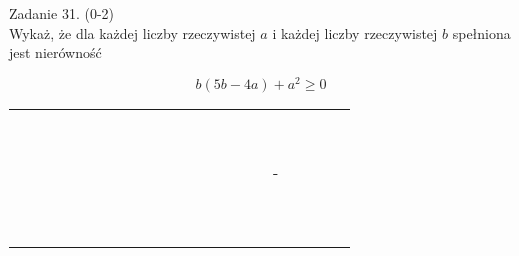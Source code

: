 \documentclass[10pt]{article}
\begin{document}
Zadanie 31. (0-2)\\
Wykaż, że dla każdej liczby rzeczywistej \(a\) i każdej liczby rzeczywistej \(b\) spełniona jest nierówność

\[
b(5 b-4 a)+a^{2} \geq 0
\]

\begin{center}
\begin{tabular}{|c|c|c|c|c|c|c|c|c|c|c|c|c|c|c|c|c|c|c|c|c|}
\hline
 &  &  &  &  &  &  &  &  &  &  &  &  &  &  &  &  &  &  &  &  \\
\hline
 &  &  &  &  &  &  &  &  &  &  &  &  &  &  &  &  &  &  &  &  \\
\hline
 &  &  &  &  &  &  &  &  &  &  &  &  &  &  &  &  &  &  &  &  \\
\hline
 &  &  &  &  &  &  &  &  &  &  &  &  &  &  &  &  &  &  &  &  \\
\hline
 &  &  &  &  &  &  &  &  &  &  &  &  &  &  &  &  &  &  &  &  \\
\hline
 &  &  &  &  &  &  &  &  &  &  &  &  &  &  &  &  &  &  &  &  \\
\hline
 &  &  &  &  &  &  &  &  &  &  &  &  &  &  &  &  &  &  &  &  \\
\hline
 &  &  &  &  &  &  &  &  &  &  &  &  &  &  &  &  &  &  &  &  \\
\hline
 &  &  &  &  &  &  &  &  &  &  &  &  &  &  &  &  &  &  &  &  \\
\hline
 &  &  &  &  &  &  &  &  &  &  &  &  &  &  &  & - &  &  &  &  \\
\hline
 &  &  &  &  &  &  &  &  &  &  &  &  &  &  &  &  &  &  &  &  \\
\hline
 &  &  &  &  &  &  &  &  &  &  &  &  &  &  &  &  &  &  &  &  \\
\hline
 &  &  &  &  &  &  &  &  &  &  &  &  &  &  &  &  &  &  &  &  \\
\hline
 &  &  &  &  &  &  &  &  &  &  &  &  &  &  &  &  &  &  &  &  \\
\hline
 &  &  &  &  &  &  &  &  &  &  &  &  &  &  &  &  &  &  &  &  \\
\hline
 &  &  &  &  &  &  &  &  &  &  &  &  &  &  &  &  &  &  &  &  \\
\hline
 &  &  &  &  &  &  &  &  &  &  &  &  &  &  &  &  &  &  &  &  \\
\hline
 &  &  &  &  &  &  &  &  &  &  &  &  &  &  &  &  &  &  &  &  \\
\hline
 &  &  &  &  &  &  &  &  &  &  &  &  &  &  &  &  &  &  &  &  \\
\hline
 &  &  &  &  &  &  &  &  &  &  &  &  &  &  &  &  &  &  &  &  \\

\end{tabular}
\end{center}
\end{document}
